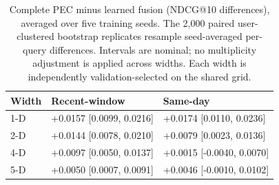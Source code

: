 \begin{table}[!htbp]
\renewcommand{\arraystretch}{1.10}
\caption{Complete PEC minus learned fusion (NDCG@10 differences), averaged over five training seeds. The 2,000 paired user-clustered bootstrap replicates resample seed-averaged per-query differences. Intervals are nominal; no multiplicity adjustment is applied across widths. Each width is independently validation-selected on the shared grid.}
\label{tab:multidimensional_fusion}
\centering
\small
\setlength{\tabcolsep}{2pt}
\begin{tabular*}{\linewidth}{@{\extracolsep{\fill}}lll@{}}
\toprule
Width & Recent-window & Same-day \\
\midrule
1-D & +0.0157 [0.0099, 0.0216] & +0.0174 [0.0110, 0.0236] \\
2-D & +0.0144 [0.0078, 0.0210] & +0.0079 [0.0023, 0.0136] \\
4-D & +0.0097 [0.0050, 0.0137] & +0.0015 [-0.0040, 0.0070] \\
5-D & +0.0050 [0.0007, 0.0091] & +0.0046 [-0.0010, 0.0102] \\
\bottomrule
\end{tabular*}
\end{table}
